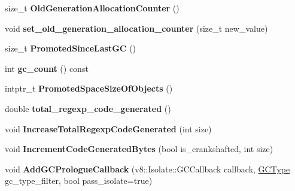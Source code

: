 \begin{DoxyCompactItemize}
\item 
size\+\_\+t {\bfseries Old\+Generation\+Allocation\+Counter} ()\hypertarget{classv8_1_1internal_1_1_heap_a27c64894e329e50dd168e5503f0661cb}{}\label{classv8_1_1internal_1_1_heap_a27c64894e329e50dd168e5503f0661cb}

\item 
void {\bfseries set\+\_\+old\+\_\+generation\+\_\+allocation\+\_\+counter} (size\+\_\+t new\+\_\+value)\hypertarget{classv8_1_1internal_1_1_heap_a832566cb97e0053c1b2fa2a2302061b8}{}\label{classv8_1_1internal_1_1_heap_a832566cb97e0053c1b2fa2a2302061b8}

\item 
size\+\_\+t {\bfseries Promoted\+Since\+Last\+GC} ()\hypertarget{classv8_1_1internal_1_1_heap_a6361feb202728e23673635095aae4904}{}\label{classv8_1_1internal_1_1_heap_a6361feb202728e23673635095aae4904}

\item 
int {\bfseries gc\+\_\+count} () const \hypertarget{classv8_1_1internal_1_1_heap_a9fe155bcb9c528c72821cc32ee644b02}{}\label{classv8_1_1internal_1_1_heap_a9fe155bcb9c528c72821cc32ee644b02}

\item 
intptr\+\_\+t {\bfseries Promoted\+Space\+Size\+Of\+Objects} ()\hypertarget{classv8_1_1internal_1_1_heap_af0a1486941c5083a8c528ceb810dcb96}{}\label{classv8_1_1internal_1_1_heap_af0a1486941c5083a8c528ceb810dcb96}

\item 
double {\bfseries total\+\_\+regexp\+\_\+code\+\_\+generated} ()\hypertarget{classv8_1_1internal_1_1_heap_accfa8fe064d2e46d78418f902228e694}{}\label{classv8_1_1internal_1_1_heap_accfa8fe064d2e46d78418f902228e694}

\item 
void {\bfseries Increase\+Total\+Regexp\+Code\+Generated} (int size)\hypertarget{classv8_1_1internal_1_1_heap_aa16d3a9f625d687d821cbe49eac2dabd}{}\label{classv8_1_1internal_1_1_heap_aa16d3a9f625d687d821cbe49eac2dabd}

\item 
void {\bfseries Increment\+Code\+Generated\+Bytes} (bool is\+\_\+crankshafted, int size)\hypertarget{classv8_1_1internal_1_1_heap_a51b428724d3edb7fe64c5a60d5f46bd6}{}\label{classv8_1_1internal_1_1_heap_a51b428724d3edb7fe64c5a60d5f46bd6}

\item 
void {\bfseries Add\+G\+C\+Prologue\+Callback} (v8\+::\+Isolate\+::\+G\+C\+Callback callback, \hyperlink{namespacev8_ac109d6f27e0c0f9ef4e98bcf7a806cf2}{G\+C\+Type} gc\+\_\+type\+\_\+filter, bool pass\+\_\+isolate=true)\hypertarget{classv8_1_1internal_1_1_heap_a723a3b2122b7a1e151617f4fba4117f8}{}\label{classv8_1_1internal_1_1_heap_a723a3b2122b7a1e151617f4fba4117f8}


\end{DoxyCompactItemize}
